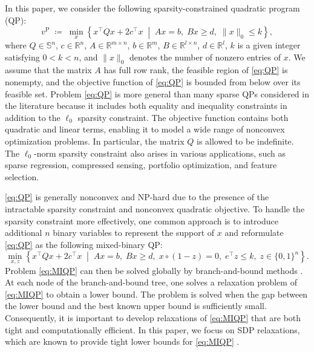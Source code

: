 \documentclass[11pt]{article}
\theoremstyle{plain}
\begin{document}
In this paper, we consider the following sparsity-constrained quadratic program (QP):
\begingroup
\renewcommand{\theequation}{P}
\begin{equation}\label{eq:QP}
v^{\mathrm{P}}
\;\coloneqq\;
\min_{x}
\left\{
 x^\top Q x + 2c^\top x
\;\middle|\;
Ax=b,\; Bx\geq d,\;
\|x\|_0\le k
\right\},\tag{P}
\end{equation}
\endgroup
where \(Q \in \mathbb{S}^n\), \(c \in \mathbb{R}^n\), \(A \in \mathbb{R}^{m \times n}\), \(b \in \mathbb{R}^m\), \(B \in \mathbb{R}^{l \times n}\), \(d \in \mathbb{R}^l\), $k$ is a given integer satisfying $0 < k < n$, and \(\|x\|_0\) denotes the number of nonzero entries of \(x\). We assume that the matrix $A$ has full row rank, the feasible region of \eqref{eq:QP} is nonempty, and the objective function of \eqref{eq:QP} is bounded from below over its feasible set.
Problem \eqref{eq:QP} is more general than many sparse QPs considered in the literature because it includes both equality and inequality constraints in addition to the $\ell_0$ sparsity constraint. 
The objective function contains both quadratic and linear terms, enabling it to model a wide range of nonconvex optimization problems. In particular, the matrix $Q$ is allowed to be indefinite.
The $ \ell_0$-norm sparsity constraint also arises in various applications, such as sparse regression, compressed sensing, portfolio optimization, and feature selection. 

\eqref{eq:QP} is generally nonconvex and NP-hard due to the presence of the intractable sparsity constraint and nonconvex quadratic objective. 
To handle the sparsity constraint more effectively, 
one common approach is to
introduce additional $n$ binary variables to represent the support of $x$ and
reformulate \eqref{eq:QP} as the following mixed-binary QP: 
\begin{equation}\label{eq:MIQP}
\min_{x,z}
\left\{
 x^\top Q x + 2c^\top x
\;\middle|\;
Ax=b,\; Bx\geq d,\;
x\circ (1-z)=0,\;
e^\top z\leq k,\;
z\in \{0,1\}^n
\right\}.
\end{equation}
Problem \eqref{eq:MIQP} can then be solved globally by branch-and-bound methods \cite{land1960automatic,mitten1970branch,boyd2007branch}. At each node of the branch-and-bound tree, one solves a relaxation problem of \eqref{eq:MIQP} to obtain a lower bound. The problem is solved when the gap between the lower bound and the best known upper bound is sufficiently small. 
Consequently, it is important to develop relaxations of \eqref{eq:MIQP} that are both tight and computationally efficient. In this paper, we focus on SDP relaxations, which are known to provide tight lower bounds for \eqref{eq:MIQP} \cite{bomze2025tighter}.
\end{document}
